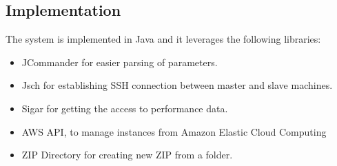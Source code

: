 \subsection{Implementation}
The system is implemented in Java and it leverages the following libraries:
\begin{itemize}
 \item JCommander for easier parsing of parameters.
 \item Jsch for establishing SSH connection between master and slave machines.
 \item Sigar for getting the access to performance data.
 \item AWS API, to manage instances from Amazon Elastic Cloud Computing
 \item ZIP Directory for creating new ZIP from a folder.
\end{itemize}



